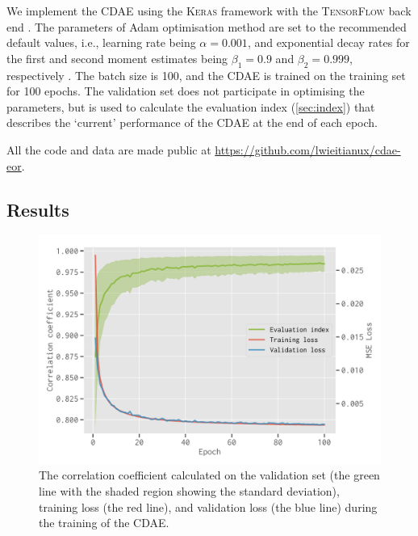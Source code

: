 \documentclass[letters,a4paper,fleqn,usenatbib]{mnras}
\begin{document}
We implement the CDAE using the \textsc{Keras} framework \citep{keras}
with the \textsc{TensorFlow} back end \citep{tensorflow}.
The parameters of Adam optimisation method are set to the recommended
default values, i.e., learning rate being $\alpha = 0.001$, and
exponential decay rates for the first and second moment estimates being
$\beta_1 = 0.9$ and $\beta_2 = 0.999$, respectively \citep{kingma2015}.
The batch size is 100, and the CDAE is trained on the training set
for 100 epochs.
The validation set does not participate in optimising the parameters,
but is used to calculate the evaluation index (\autoref{sec:index})
that describes the `current' performance of the CDAE at the end of
each epoch.

All the code and data are made public at
\url{https://github.com/lwieitianux/cdae-eor}.


\subsection{Results}
\label{sec:results}

\begin{figure}
  \centering
  \includegraphics[width=\columnwidth]{cdae-train}
  \caption{\label{fig:train}%
    The correlation coefficient calculated on the validation set (the
    green line with the shaded region showing the standard deviation),
    training loss (the red line), and validation loss (the blue line)
    during the training of the CDAE.
  }
\end{figure}
\end{document}
